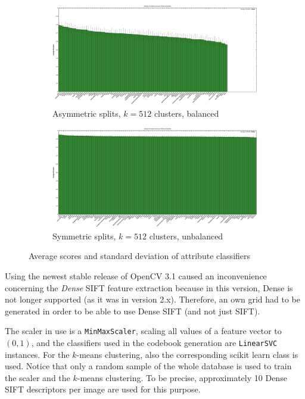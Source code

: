 \documentclass{vldb}
\begin{document}
\begin{figure}
  \centering
  \begin{subfigure}{\textwidth}
    \includegraphics[width = \textwidth]{figs/scores_asymmetric_512classes_balanced.eps}
    \caption{Asymmetric splits, $k = 512$ clusters, balanced}
    \label{subfig:scores-classifiers-asymmetric-512-balanced}
  \end{subfigure}
  \begin{subfigure}{\textwidth}
    \includegraphics[width = \textwidth]{figs/scores_symmetric_512classes_unbalanced.eps}
    \caption{Symmetric splits, $k = 512$ clusters, unbalanced}
    \label{subfig:scores-classifiers-symmetric-512-unbalanced}
  \end{subfigure}
  \caption{Average scores and standard deviation of attribute classifiers}
  \label{fig:scores-classifiers-512}
\end{figure}

Using the newest stable release of OpenCV 3.1 caused an inconvenience concerning
the \emph{Dense} SIFT feature extraction because in this version, Dense is not
longer supported (as it was in version 2.x). Therefore, an own grid had to be
generated in order to be able to use Dense SIFT (and not just SIFT).

The scaler in use is a \texttt{MinMaxScaler}, scaling all values of a feature
vector to $(0, 1)$, and the classifiers used in the codebook generation are
\texttt{LinearSVC} instances. For the $k$-means clustering, also the corresponding
scikit learn class is used. Notice that only a random sample of the whole database
is used to train the scaler and the $k$-means clustering. To be precise,
approximately 10 Dense SIFT descriptors per image are used for this purpose.
\end{document}
